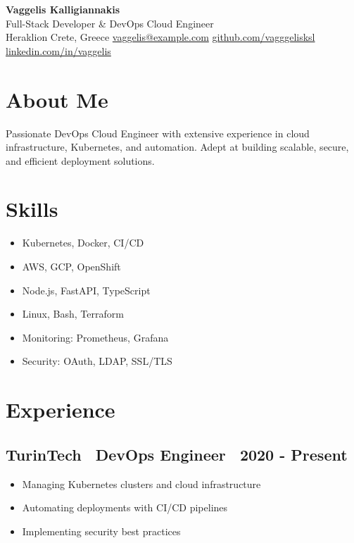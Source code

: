 \documentclass[a4paper,10pt]{article}
\begin{document}
\pagestyle{empty}

\begin{center}
    {\huge \textbf{Vaggelis Kalligiannakis} } \\
    {\large Full-Stack Developer \& DevOps Cloud Engineer} \\
    \vspace{10pt}
     Heraklion Crete, Greece \quad
     \href{mailto:vaggelis@example.com}{vaggelis@example.com} \quad
     \href{https://github.com/vagggelisksl}{github.com/vagggelisksl} \quad
     \href{https://linkedin.com/in/vaggelis}{linkedin.com/in/vaggelis}
\end{center}

\vspace{15pt}

\section*{ About Me}
Passionate DevOps Cloud Engineer with extensive experience in cloud infrastructure, Kubernetes, and automation. Adept at building scalable, secure, and efficient deployment solutions.

\vspace{10pt}

\section*{ Skills}
\begin{itemize}[left=0pt, label=]
    \item Kubernetes, Docker, CI/CD
    \item AWS, GCP, OpenShift
    \item Node.js, FastAPI, TypeScript
    \item Linux, Bash, Terraform
    \item Monitoring: Prometheus, Grafana
    \item Security: OAuth, LDAP, SSL/TLS
\end{itemize}

\vspace{10pt}

\section*{ Experience}
\subsection*{TurinTech \textbar\ DevOps Engineer \textbar\ 2020 - Present}
\begin{itemize}[left=0pt, label=]
    \item Managing Kubernetes clusters and cloud infrastructure
    \item Automating deployments with CI/CD pipelines
    \item Implementing security best practices
\end{itemize}
\end{document}
